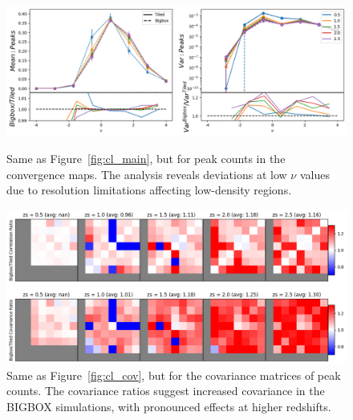 \begin{figure}[p]
    \centering
    \includegraphics[width=\textwidth]{figures/results/peaks_main.png}
    \caption[Peak Counts Mean and Variance]{Same as Figure~\ref{fig:cl_main}, but for peak counts in the convergence maps. The analysis reveals deviations at low $\nu$ values due to resolution limitations affecting low-density regions.}
    \label{fig:peak_main}
    \vspace{2cm}
    \includegraphics[width=\textwidth]{figures/results/peaks_cov.png}
    \caption[Peak Counts Covariance]{Same as Figure~\ref{fig:cl_cov}, but for the covariance matrices of peak counts. The covariance ratios suggest increased covariance in the BIGBOX simulations, with pronounced effects at higher redshifts.}
    \label{fig:peak_cov}
\end{figure}

